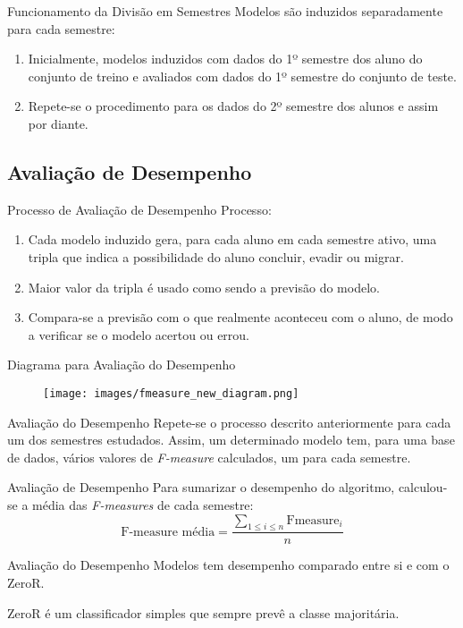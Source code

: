 \begin{frame}{Funcionamento da Divisão em Semestres}
    Modelos são induzidos separadamente para cada
    semestre: 
    \begin{enumerate}
        \item Inicialmente, modelos induzidos com dados do 1º semestre dos
             aluno do conjunto de treino e avaliados com dados do 1º semestre do
             conjunto de teste. 
         \item Repete-se o procedimento para os dados do 2º semestre dos alunos e
             assim por diante.
    \end{enumerate}
\end{frame}

\subsection{Avaliação de Desempenho}
\begin{frame}{Processo de Avaliação de Desempenho}
    Processo: 
    \begin{enumerate}
        \item Cada modelo induzido gera, para cada aluno em cada semestre ativo, uma
            tripla que indica a possibilidade do aluno concluir, evadir ou migrar. 
        \item Maior valor da tripla é usado como sendo a previsão do modelo. 
        \item Compara-se a previsão com o que realmente aconteceu com o aluno, de
            modo a verificar se o modelo acertou ou errou. 
    \end{enumerate}
\end{frame}

\begin{frame}{Diagrama para Avaliação do Desempenho}
    \begin{figure}[!ht]
        \centering
        \texttt{[image: images/fmeasure\_new\_diagram.png]}
    \end{figure}
\end{frame}

\begin{frame}{Avaliação do Desempenho}
    Repete-se o processo descrito anteriormente para cada um dos semestres estudados.
    Assim, um determinado modelo tem, para uma base de dados, vários valores de
    \textit{F-measure} calculados, um para cada semestre. 
\end{frame}

\begin{frame}{Avaliação de Desempenho}
    Para sumarizar o desempenho do algoritmo, calculou-se a média das
    \textit{F-measures} de cada semestre: 
    \begin{equation}
        \text{F-measure média} = \frac{\sum\limits_{1 \le i \le n} \text{Fmeasure}_i}
                                    {n}
    \end{equation}
\end{frame}

\begin{frame}{Avaliação do Desempenho}
    Modelos tem desempenho comparado entre si e com o ZeroR. 

    \vspace{0.5cm}

    ZeroR é um classificador simples que sempre prevê a classe majoritária. 
\end{frame}

